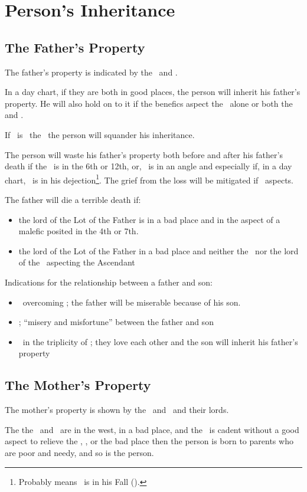\section{Person's Inheritance}

\subsection{The Father's Property}
The father's property is indicated by the \Sun\, and \Saturn.

In a day chart, if they are both in good places, the person will inherit his father's property. He will also hold on to it if  the benefics aspect the \Sun\, alone or both the \Sun\, and \Saturn.

If  \Mars\ is \Square\, the \Sun\, the person will squander his inheritance. 

The person will waste his father's property both before and after his father's death if the \Sun\, is in the 6th or 12th, or, \Mars\, is in an angle and especially if, in a day chart, \Saturn\, is in his dejection\footnote{Probably means \Saturn\, is in his Fall (\Aries).}. The grief from the loss will be mitigated if \Jupiter\, aspects.

The father will die a terrible death if:
\begin{itemize}[topsep=0em,itemsep=0em]
\item the lord of the Lot of the Father is in a bad place and in the aspect of a malefic posited in the 4th or 7th.

\item the lord of the Lot of the Father in a bad place and neither the \Sun\, nor the lord of the \Sun\, aspecting the Ascendant
\end{itemize}

Indications for the relationship between a father and son:
\begin{itemize}[topsep=0em,itemsep=0em]

\item  \Jupiter\, overcoming \Saturn; the father will be miserable because of his son.

\item \Jupiter\Opposition\Sun; ``misery and misfortune'' between the father and son

\item \Saturn\, in the triplicity of \Jupiter; they love each other and the son will inherit his father's property
\end{itemize}

\subsection{The Mother's Property}
The mother's property is shown by the \Moon\, and \Venus\, and their lords.

The the \Moon\, and \Venus\, are in the west, in a bad place, and the \Sun\, is cadent without a good aspect to relieve the \Moon, \Venus, or the bad place then the person is born to parents who are poor and needy, and so is the person.



